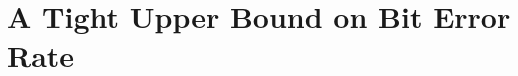 \documentclass{standalone}
\begin{document}
\thesistranslationoriginal
\section{A Tight Upper Bound on Bit Error Rate}
\end{document}
